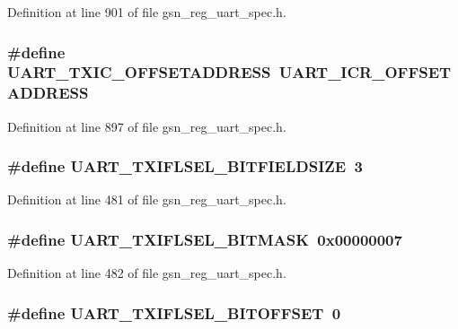 Definition at line 901 of file gsn\_\-reg\_\-uart\_\-spec.h.

\hypertarget{a00575_aa91ef20e0b10a0aac7c44b4027cb256f}{
\subsubsection[{UART\_\-TXIC\_\-OFFSETADDRESS}]{\setlength{\rightskip}{0pt plus 5cm}\#define UART\_\-TXIC\_\-OFFSETADDRESS~UART\_\-ICR\_\-OFFSETADDRESS}}
\label{a00575_aa91ef20e0b10a0aac7c44b4027cb256f}


Definition at line 897 of file gsn\_\-reg\_\-uart\_\-spec.h.

\hypertarget{a00575_a145513882c6159df59c43b4c439c1891}{
\subsubsection[{UART\_\-TXIFLSEL\_\-BITFIELDSIZE}]{\setlength{\rightskip}{0pt plus 5cm}\#define UART\_\-TXIFLSEL\_\-BITFIELDSIZE~3}}
\label{a00575_a145513882c6159df59c43b4c439c1891}


Definition at line 481 of file gsn\_\-reg\_\-uart\_\-spec.h.

\hypertarget{a00575_a368849c4bf3824ac54f61053136753b9}{
\subsubsection[{UART\_\-TXIFLSEL\_\-BITMASK}]{\setlength{\rightskip}{0pt plus 5cm}\#define UART\_\-TXIFLSEL\_\-BITMASK~0x00000007}}
\label{a00575_a368849c4bf3824ac54f61053136753b9}


Definition at line 482 of file gsn\_\-reg\_\-uart\_\-spec.h.

\hypertarget{a00575_a6ad19e7159164f4e561a1ff3af25426d}{
\subsubsection[{UART\_\-TXIFLSEL\_\-BITOFFSET}]{\setlength{\rightskip}{0pt plus 5cm}\#define UART\_\-TXIFLSEL\_\-BITOFFSET~0}}
\label{a00575_a6ad19e7159164f4e561a1ff3af25426d}


